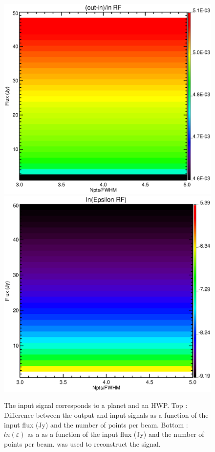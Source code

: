 \begin{figure}[h]
\center
	\includegraphics[scale=0.5]{Figures/diff_rf_planet_hwp.eps}
	\includegraphics[scale=0.5]{Figures/epsilon_rf_planet_hwp.eps}
	\caption{The input signal corresponds to a planet and an HWP. Top : Difference between the output and input signals as a function of the input flux (Jy) and the number of points per beam. Bottom : $ln(\varepsilon)$ as a as a function of the input flux (Jy) and the number of points per beam. \rf was used to reconstruct the signal.}
	\label{fig:epsilon-rf-planet-hwp}
\end{figure}

